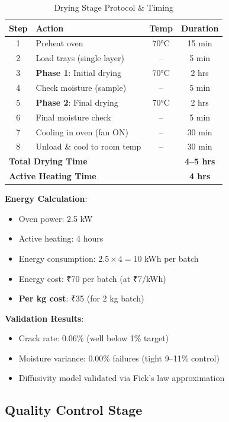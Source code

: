 \documentclass[12pt,a4paper]{article}
\begin{document}
\begin{table}[h]
\centering
\begin{tabular}{clcc}
\toprule
\textbf{Step} & \textbf{Action} & \textbf{Temp} & \textbf{Duration} \\
\midrule
1 & Preheat oven & 70°C & 15 min \\
2 & Load trays (single layer) & -- & 5 min \\
3 & \textbf{Phase 1}: Initial drying & 70°C & 2 hrs \\
4 & Check moisture (sample) & -- & 5 min \\
5 & \textbf{Phase 2}: Final drying & 70°C & 2 hrs \\
6 & Final moisture check & -- & 5 min \\
7 & Cooling in oven (fan ON) & -- & 30 min \\
8 & Unload \& cool to room temp & -- & 30 min \\
\midrule
\multicolumn{2}{l}{\textbf{Total Drying Time}} & & \textbf{4--5 hrs} \\
\multicolumn{2}{l}{\textbf{Active Heating Time}} & & \textbf{4 hrs} \\
\bottomrule
\end{tabular}
\caption{Drying Stage Protocol \& Timing}
\end{table}

\textbf{Energy Calculation}:
\begin{itemize}
    \item Oven power: 2.5 kW
    \item Active heating: 4 hours
    \item Energy consumption: $2.5 \times 4 = 10$ kWh per batch
    \item Energy cost: ₹70 per batch (at ₹7/kWh)
    \item \textbf{Per kg cost}: ₹35 (for 2 kg batch)
\end{itemize}

\textbf{Validation Results}:
\begin{itemize}
    \item Crack rate: 0.06\% (well below 1\% target)
    \item Moisture variance: 0.00\% failures (tight 9--11\% control)
    \item Diffusivity model validated via Fick's law approximation
\end{itemize}

\newpage

\subsection{Quality Control Stage}
\end{document}
